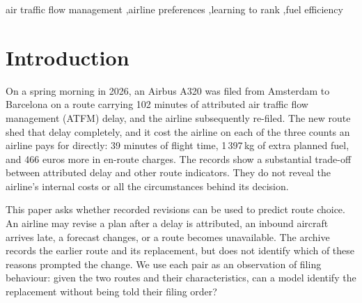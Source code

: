 \documentclass[preprint,authoryear,12pt]{elsarticle}
\begin{document}
\begin{frontmatter}
\begin{abstract}
We use 1.48 million pairs from eighteen months of European traffic to
train a ranking model with route indicators, flight context and waypoint
identifiers. Shared flight attributes prevent message timing from
revealing the label. On a later test quarter, the model identifies the
replacement in 68.1\,\% of cases, compared with 55.0\,\% for the best
single-indicator rule and 57.5\,\% for the strongest logistic baseline.
Accuracy reaches 94.9\,\% on the fifth of pairs with the highest
confidence. Matched examples of retained routes improve predictions on
a smaller stay-pair test set. A retrospective policy then selects
lower-fuel routes above a calibrated probability threshold. At an
operating point targeting 80\,\% precision, 79.2\,\% of selections
match the subsequent filing and account for 20.1\,kilotonnes of
planned-fuel differences over the quarter. These results establish
useful prediction and confidence-based selection from revision records.
The fuel total describes historical choices; acceptance of actual
proposals and additional savings require prospective evaluation.

\end{abstract}

\begin{keyword}
air traffic flow management \sep airline preferences \sep learning to
rank \sep fuel efficiency
\end{keyword}

\end{frontmatter}

\section{Introduction}
\label{sec:intro}

On a spring morning in 2026, an Airbus A320 was filed from Amsterdam to
Barcelona on a route carrying 102 minutes of attributed air traffic
flow management (ATFM) delay, and the airline subsequently re-filed.
The new route shed that delay completely, and it cost the airline on
each of the three counts an airline pays for directly: 39 minutes of
flight time, 1\,397\,kg of extra planned fuel, and 466 euros more in
en-route charges. The records show a substantial trade-off between attributed delay and
other route indicators. They do not reveal the airline's internal costs
or all the circumstances behind its decision.

This paper asks whether recorded revisions can be used to predict route
choice. An airline may revise a plan after a delay is attributed, an
inbound aircraft arrives late, a forecast changes, or a route becomes
unavailable. The archive records the earlier route and its replacement,
but does not identify which of these reasons prompted the change. We
use each pair as an observation of filing behaviour: given the two routes
and their characteristics, can a model identify the replacement without
being told their filing order?
\end{document}
